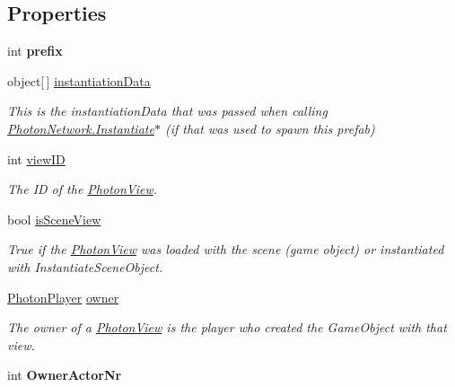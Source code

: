 \subsection*{Properties}
\begin{DoxyCompactItemize}
\item 
int {\bfseries prefix}\hypertarget{class_photon_view_aae1e4dcb7cf0cf2cd460490cefdcda46}{}\label{class_photon_view_aae1e4dcb7cf0cf2cd460490cefdcda46}

\item 
object\mbox{[}$\,$\mbox{]} \hyperlink{class_photon_view_a0d1e63579ed533e6394ca7f12b313c7c}{instantiation\+Data}
\begin{DoxyCompactList}\small\item\em This is the instantiation\+Data that was passed when calling \hyperlink{class_photon_network_a843d9f62d28ab123c83291c1e6bb857d}{Photon\+Network.\+Instantiate}$\ast$ (if that was used to spawn this prefab) \end{DoxyCompactList}\item 
int \hyperlink{class_photon_view_a309ddedb443400696cf80da2ff579262}{view\+ID}
\begin{DoxyCompactList}\small\item\em The ID of the \hyperlink{class_photon_view}{Photon\+View}. \end{DoxyCompactList}\item 
bool \hyperlink{class_photon_view_a65ea130a5d46f64984ff5361518f6050}{is\+Scene\+View}
\begin{DoxyCompactList}\small\item\em True if the \hyperlink{class_photon_view}{Photon\+View} was loaded with the scene (game object) or instantiated with Instantiate\+Scene\+Object. \end{DoxyCompactList}\item 
\hyperlink{class_photon_player}{Photon\+Player} \hyperlink{class_photon_view_ad696cb93fb9835d633b9def970650edc}{owner}
\begin{DoxyCompactList}\small\item\em The owner of a \hyperlink{class_photon_view}{Photon\+View} is the player who created the Game\+Object with that view. \end{DoxyCompactList}\item 
int {\bfseries Owner\+Actor\+Nr}\hypertarget{class_photon_view_a535e478c9fe2fce6af7102e32833135a}{}\label{class_photon_view_a535e478c9fe2fce6af7102e32833135a}


\end{DoxyCompactItemize}
